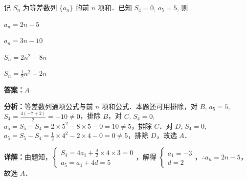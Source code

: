 \begin{question}[points=5]
记 $S_n$ 为等差数列 $\{a_n\}$ 的前 $n$ 项和．已知 $S_4 = 0$, $a_5 = 5$, 则
\begin{choices}
  \item $a_n = 2n - 5$
  \item $a_n = 3n - 10$
  \item $S_n = 2n^2 - 8n$
  \item $S_n = \frac{1}{2}n^2 - 2n$
\end{choices}
\begin{solution}
\textbf{答案：}$A$

\textbf{分析：}等差数列通项公式与前 $n$ 项和公式．本题还可用排除，对 $B$, $a_5 = 5$, $S_4 = \frac{4(-7 + 2)}{2} = -10 \neq 0$，排除 $B$，对 $C$, $S_4 = 0$, $a_5 = S_5 - S_4 = 2 \times 5^2 - 8 \times 5 - 0 = 10 \neq 5$，排除 $C$．对 $D$, $S_4 = 0$, $a_5 = S_5 - S_4 = \frac{1}{2} \times 4^2 - 2 \times 4 - 0 = 0 \neq 5$，排除 $D$，故选 $A$．

\textbf{详解：}由题知，$\begin{cases} S_4 = 4a_1 + \frac{d}{2} \times 4 \times 3 = 0 \\ a_5 = a_1 + 4d = 5 \end{cases}$，解得 $\begin{cases} a_1 = -3 \\ d = 2 \end{cases}$，$\therefore a_n = 2n - 5$，故选 $A$．
\end{solution}
\end{question}

